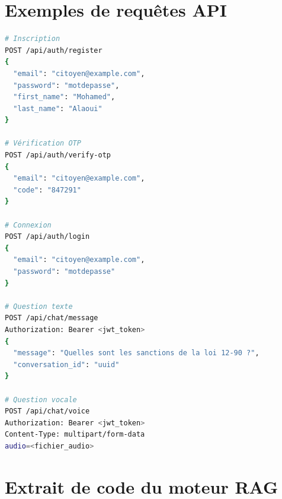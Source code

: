 \documentclass[12pt,a4paper]{report}
\begin{document}
\section{Exemples de requêtes API}

\begin{lstlisting}[language=bash, caption={Exemples de requêtes API}]
# Inscription
POST /api/auth/register
{
  "email": "citoyen@example.com",
  "password": "motdepasse",
  "first_name": "Mohamed",
  "last_name": "Alaoui"
}

# Vérification OTP
POST /api/auth/verify-otp
{
  "email": "citoyen@example.com",
  "code": "847291"
}

# Connexion
POST /api/auth/login
{
  "email": "citoyen@example.com",
  "password": "motdepasse"
}

# Question texte
POST /api/chat/message
Authorization: Bearer <jwt_token>
{
  "message": "Quelles sont les sanctions de la loi 12-90 ?",
  "conversation_id": "uuid"
}

# Question vocale
POST /api/chat/voice
Authorization: Bearer <jwt_token>
Content-Type: multipart/form-data
audio=<fichier_audio>
\end{lstlisting}

\section{Extrait de code du moteur RAG}
\end{document}
